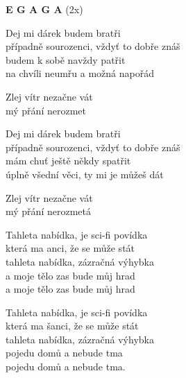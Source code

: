 
\re{}
{\footnotesize\textbf{E G A G A}} (2x)

\ve{}
Dej mi dárek budem bratři \\
případně sourozenci, vždyť to dobře znáš \\
budem k sobě navždy patřit \\
na chvíli neumřu a možná napořád 

\re{*:}
Zlej vítr nezačne vát\\
mý přání nerozmet

\ve{}
Dej mi dárek budem bratři\\
případně sourozenci, vždyť to dobře znáš\\
mám chuť ještě někdy spatřit\\
úplně všední věci, ty mi je můžeš dát

\re{*:}
Zlej vítr nezačne vát\\
mý přání nerozmetá

\cho{}
Tahleta nabídka, je sci-fi povídka\\
která ma anci, že se může stát\\
tahleta nabídka, zázračná výhybka\\
a moje tělo zas bude můj hrad\\
a moje tělo zas bude můj hrad

\ve{}
Tahleta nabídka, je sci-fi povídka\\
která ma šanci, že se může stát\\
tahleta nabídka, zázračná výhybka\\
pojedu domů a nebude tma\\
pojedu domů a nebude tma.

\esong{}
